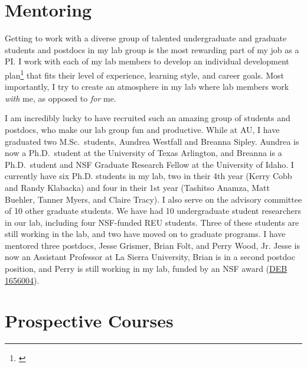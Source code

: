 \section*{Mentoring}
Getting to work with a diverse group of talented undergraduate and graduate
students and postdocs in my lab group is the most rewarding part of my job as a
PI.
I work with each of my lab members to develop an individual development
plan\footnote{\label{idp}} that fits
their level of experience, learning style, and career goals.
Most importantly, I try to create an atmosphere in my lab where
lab members work \emph{with} me, as opposed to \emph{for} me.

I am incredibly lucky to have recruited such an amazing group of students and
postdocs, who make
our lab group fun and productive.
While at AU, I have graduated two M.Sc.\ students, Aundrea Westfall
and Breanna Sipley.
Aundrea is now a Ph.D.\ student at the University of Texas Arlington,
and
Breanna is a Ph.D.\ student and NSF Graduate Research Fellow at the University
of Idaho.
I currently have six Ph.D. students in my lab, two in their 4th
year (Kerry Cobb and Randy Klabacka) and four in their 1st year
(Tashitso Anamza, Matt Buehler, Tanner Myers, and Claire Tracy).
I also serve on the advisory committee of 10 other graduate students.
We have had 10 undergraduate student researchers in our lab, including four
NSF-funded REU students.
Three of these students are still working in the lab,
and two have moved on to graduate programs.
I have mentored three postdocs, Jesse Grismer, Brian Folt, and Perry Wood, Jr.
Jesse is now an Assistant Professor at La Sierra University,
Brian is in a second postdoc position,
and Perry is still working in my lab, funded by an NSF award
(\href{https://www.nsf.gov/awardsearch/showAward?AWD_ID=1656004&HistoricalAwards=false}{DEB 1656004}).


\section*{Prospective Courses}


